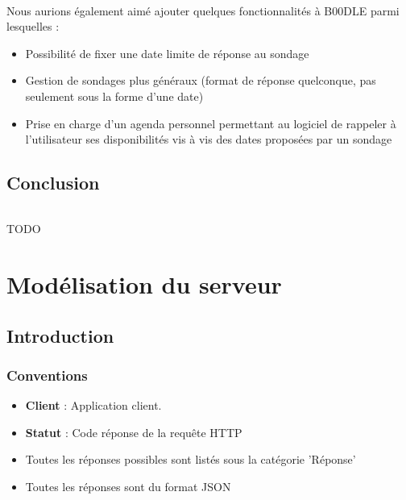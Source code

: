 \documentclass[titlepage]{report}
\begin{document}
\paragraph{} Nous aurions également aimé ajouter quelques fonctionnalités à B00DLE parmi lesquelles : \begin{itemize}
	\item Possibilité de fixer une date limite de réponse au sondage
	\item Gestion de sondages plus généraux (format de réponse quelconque, pas seulement sous la forme d'une date)
	\item Prise en charge d'un agenda personnel permettant au logiciel de rappeler à l'utilisateur ses disponibilités vis à vis des dates proposées par un sondage
\end{itemize}

\chapter{Conclusion}

\paragraph{}TODO

\clearpage
\part{Modélisation du serveur}
\label{part_modelServer}

\lstset{language=XML,
	basicstyle=\ttfamily,
	breaklines=true} 

\chapter{Introduction}

\section{Conventions}
\begin{itemize}
	\item \textbf{Client} : Application client.
	\item \textbf{Statut} : Code réponse de la requête HTTP
	\item Toutes les réponses possibles sont listés sous la catégorie 'Réponse'
	\item Toutes les réponses sont du format JSON
\end{itemize}
\end{document}
